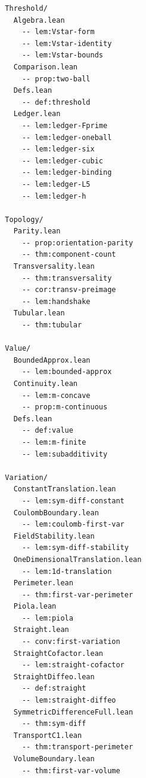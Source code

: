 {\begin{verbatim}
  Threshold/
    Algebra.lean
      -- lem:Vstar-form
      -- lem:Vstar-identity
      -- lem:Vstar-bounds
    Comparison.lean
      -- prop:two-ball
    Defs.lean
      -- def:threshold
    Ledger.lean
      -- lem:ledger-Fprime
      -- lem:ledger-oneball
      -- lem:ledger-six
      -- lem:ledger-cubic
      -- lem:ledger-binding
      -- lem:ledger-L5
      -- lem:ledger-h

  Topology/
    Parity.lean
      -- prop:orientation-parity
      -- thm:component-count
    Transversality.lean
      -- thm:transversality
      -- cor:transv-preimage
      -- lem:handshake
    Tubular.lean
      -- thm:tubular

  Value/
    BoundedApprox.lean
      -- lem:bounded-approx
    Continuity.lean
      -- lem:m-concave
      -- prop:m-continuous
    Defs.lean
      -- def:value
      -- lem:m-finite
      -- lem:subadditivity

  Variation/
    ConstantTranslation.lean
      -- lem:sym-diff-constant
    CoulombBoundary.lean
      -- lem:coulomb-first-var
    FieldStability.lean
      -- lem:sym-diff-stability
    OneDimensionalTranslation.lean
      -- lem:1d-translation
    Perimeter.lean
      -- thm:first-var-perimeter
    Piola.lean
      -- lem:piola
    Straight.lean
      -- conv:first-variation
    StraightCofactor.lean
      -- lem:straight-cofactor
    StraightDiffeo.lean
      -- def:straight
      -- lem:straight-diffeo
    SymmetricDifferenceFull.lean
      -- thm:sym-diff
    TransportC1.lean
      -- thm:transport-perimeter
    VolumeBoundary.lean
      -- thm:first-var-volume
\end{verbatim}
}
